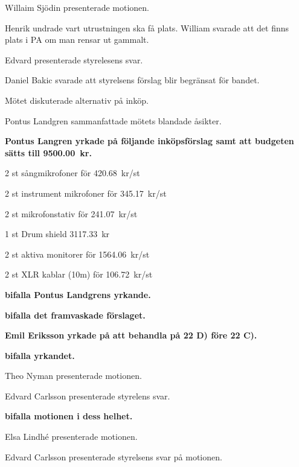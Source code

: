 \documentclass[10pt]{article}
\begin{document}
\begin{paragrafer}
\begin{paragrafer}

      Willaim Sjödin presenterade motionen. 

      Henrik undrade vart utrustningen ska få plats. William svarade att det finns plats i PA om man rensar ut gammalt. 

      Edvard presenterade styrelesens svar. 

      Daniel Bakic svarade att styrelsens förslag blir begränsat för bandet. 

      Mötet diskuterade alternativ på inköp.

      Pontus Landgren sammanfattade mötets blandade åsikter.

      \textbf{Pontus Langren yrkade på följande inköpsförslag samt att budgeten sätts till \SI{9500,00}{kr}.}

      \begin{dashlist}
        \item 2 st sångmikrofoner för \SI{420,68}{kr/st} 
        \item 2 st instrument mikrofoner för \SI{345,17}{kr/st} 
        \item 2 st mikrofonstativ för \SI{241,07}{kr/st} 
        \item 1 st Drum shield \SI{3117,33}{kr} 
        \item 2 st aktiva monitorer för \SI{1564,06}{kr/st}
        \item 2 st XLR kablar (10m) för \SI{106,72}{kr/st}
      \end{dashlist}
      \textbf{\Mba bifalla Pontus Landgrens yrkande.}

      \textbf{\Mba bifalla det framvaskade förslaget.}


      \textbf{Emil Eriksson yrkade på att behandla på 22 D) före 22 C).} 
      
      \textbf{\Mba bifalla yrkandet.}


      Theo Nyman presenterade motionen. 

      Edvard Carlsson presenterade styrelens svar. 

      \textbf{\Mba bifalla motionen i dess helhet.}


      Elsa Lindhé presenterade motionen. 

      Edvard Carlsson presenterade styrelsens svar på motionen. 
      

\end{paragrafer}
\end{paragrafer}
\end{document}
